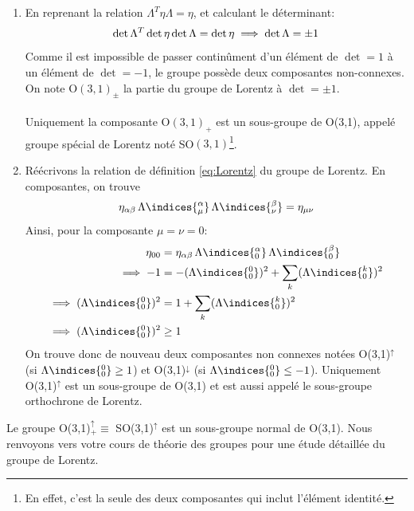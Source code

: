 \begin{enumerate}
    \item En reprenant la relation $\Lambda ^{T} \eta \Lambda = \eta$, et calculant le déterminant:
    \begin{equation}
        \det \Lambda^{T} \det \eta \det\Lambda = \det \eta \\
        \implies \det\Lambda = \pm 1
    \end{equation}
    Comme il est impossible de passer continûment d'un élément de $\det =1$ à un élément de $\det = -1$, le groupe possède deux composantes non-connexes. On note O$(3,1)_\pm$ la partie du groupe de Lorentz à $\det = \pm 1$.\\
    \\
    Uniquement la composante O$(3,1)_+$ est un sous-groupe de O(3,1), appelé groupe spécial de Lorentz noté SO$(3,1)$\footnote{En effet, c'est la seule des deux composantes qui inclut l'élément identité.}. \\

    
    \item Réécrivons la relation de définition \ref{eq:Lorentz} du groupe de Lorentz. En composantes, on trouve
    \begin{equation}
        \eta_{\alpha \beta}\, \Lambda\indices{^\alpha_{\mu}} \,\Lambda\indices{^\beta_{\nu}} = \eta_{\mu \nu}
    \end{equation}
    Ainsi, pour la composante $\mu = \nu =0$:
    \begin{align}
        \eta_{0 0} &= \eta_{\alpha \beta} \,\Lambda\indices{^\alpha_{0}} \, \Lambda\indices{^\beta_{0}} \\
        \implies -1 &= -(\Lambda\indices{^0_{0}})^2 + \sum_{k}(\Lambda\indices{^k_0})^2\\
        \implies (\Lambda\indices{^0_0})^2 &= 1 + \sum_{k}(\Lambda\indices{^k_0})^2\\
        \implies (\Lambda\indices{^0_0})^2 &\geq 1
    \end{align}
    On trouve donc de nouveau deux composantes non connexes notées O(3,1)$^\uparrow$ (si $\Lambda\indices{^0_0} \geq 1$) et O(3,1)$^\downarrow$ (si $\Lambda\indices{^0_0} \leq - 1$). Uniquement O(3,1)$^\uparrow$ est un sous-groupe de O(3,1) et est aussi appelé le sous-groupe orthochrone de Lorentz.
\end{enumerate}
Le groupe O(3,1)$^\uparrow_+ \equiv$ SO(3,1)$^\uparrow$ est un sous-groupe normal de O(3,1). Nous renvoyons vers votre cours de théorie des groupes pour une étude détaillée du groupe de Lorentz.
